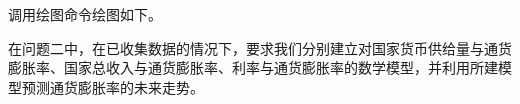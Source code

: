 调用绘图命令绘图如下。

%		
%		
%		
%		
%		
%		
%		
%		
%	



在问题二中，在已收集数据的情况下，要求我们分别建立对国家货币供给量与通货膨胀率、国家总收入与通货膨胀率、利率与通货膨胀率的数学模型，并利用所建模型预测通货膨胀率的未来走势。

